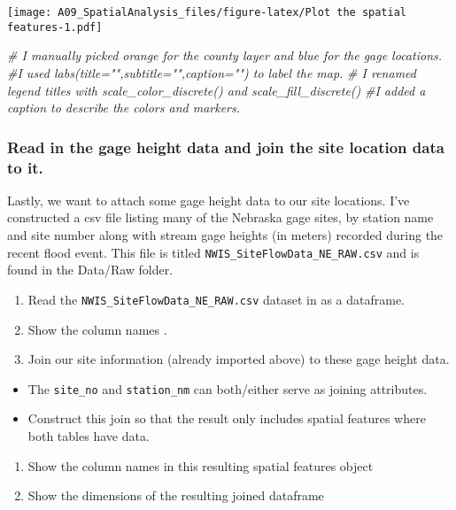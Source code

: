 \documentclass[
]{article}
\newenvironment{Shaded}{\begin{snugshade}}{\end{snugshade}}
\newcommand{\CommentTok}[1]{\textcolor[rgb]{0.56,0.35,0.01}{\textit{#1}}}
\providecommand{\tightlist}{%
  \setlength{\itemsep}{0pt}\setlength{\parskip}{0pt}}
\begin{document}
\texttt{[image: A09\_SpatialAnalysis\_files/figure-latex/Plot the spatial features-1.pdf]}

\begin{Shaded}
\begin{Highlighting}[]
\CommentTok{\# I manually picked orange for the county layer and blue for the gage locations.}
\CommentTok{\#I used labs(title="",subtitle="",caption="") to label the map.}
\CommentTok{\# I renamed legend titles with scale\_color\_discrete() and scale\_fill\_discrete()}
\CommentTok{\#I added a caption to describe the colors and markers. }
\end{Highlighting}
\end{Shaded}

\hypertarget{read-in-the-gage-height-data-and-join-the-site-location-data-to-it.}{%
\subsubsection{Read in the gage height data and join the site location
data to
it.}\label{read-in-the-gage-height-data-and-join-the-site-location-data-to-it.}}

Lastly, we want to attach some gage height data to our site locations.
I've constructed a csv file listing many of the Nebraska gage sites, by
station name and site number along with stream gage heights (in meters)
recorded during the recent flood event. This file is titled
\texttt{NWIS\_SiteFlowData\_NE\_RAW.csv} and is found in the Data/Raw
folder.

\begin{enumerate}
\def\labelenumi{\arabic{enumi}.}
\setcounter{enumi}{13}
\tightlist
\item
  Read the \texttt{NWIS\_SiteFlowData\_NE\_RAW.csv} dataset in as a
  dataframe.
\item
  Show the column names .
\item
  Join our site information (already imported above) to these gage
  height data.
\end{enumerate}

\begin{itemize}
\tightlist
\item
  The \texttt{site\_no} and \texttt{station\_nm} can both/either serve
  as joining attributes.
\item
  Construct this join so that the result only includes spatial features
  where both tables have data.
\end{itemize}

\begin{enumerate}
\def\labelenumi{\arabic{enumi}.}
\setcounter{enumi}{16}
\tightlist
\item
  Show the column names in this resulting spatial features object
\item
  Show the dimensions of the resulting joined dataframe
\end{enumerate}
\end{document}
